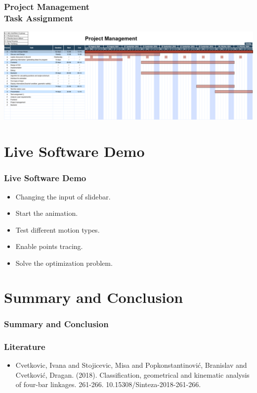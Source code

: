 \documentclass[ucs,10pt]{beamer}
\begin{document}
\begin{frame}
\frametitle{Project Management \\
	\small \color{rwth-blue} Task Assignment}

	\begin{flushleft}
		\includegraphics[height=\textheight,keepaspectratio]{./figures/project management 10-18.png}
	\end{flushleft}
\end{frame}

\section{Live Software Demo}

\begin{frame}
\frametitle{Live Software Demo}

    \begin{itemize}
        \item Changing the input of slidebar.
        \item Start the animation.
        \item Test different motion types.
        \item Enable points tracing.
        \item Solve the optimization problem.
    \end{itemize}

\end{frame}

\section{Summary and Conclusion}

\begin{frame}
\frametitle{Summary and Conclusion}
\end{frame}

\begin{frame}
\frametitle{Literature}
	\begin{itemize}
		\item Cvetkovic, Ivana and Stojicevic, Misa and Popkonstantinović, Branislav and Cvetković, Dragan. (2018). Classification, geometrical and kinematic analysis of four-bar linkages. 261-266. 10.15308/Sinteza-2018-261-266.
	\end{itemize}
\end{frame}
\end{document}
